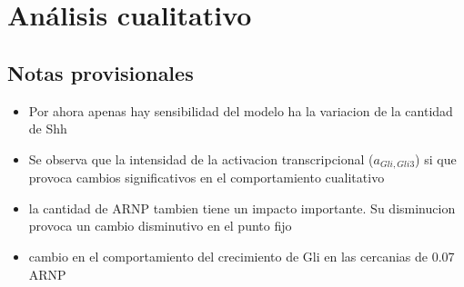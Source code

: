 \chapter{Análisis cualitativo}

\label{ch:simulation}


\section{Notas provisionales}
\begin{itemize}
	\item Por ahora apenas hay sensibilidad del modelo ha la variacion de la cantidad de Shh
	\item Se observa que la intensidad de la activacion transcripcional ($a_{Gli,Gli3}$) si que provoca cambios significativos en el comportamiento cualitativo
	\item la cantidad de ARNP tambien tiene un impacto importante. Su disminucion provoca un cambio disminutivo en el punto fijo
	\item cambio en el comportamiento del crecimiento de Gli en las cercanias de 0.07 ARNP
\end{itemize}



